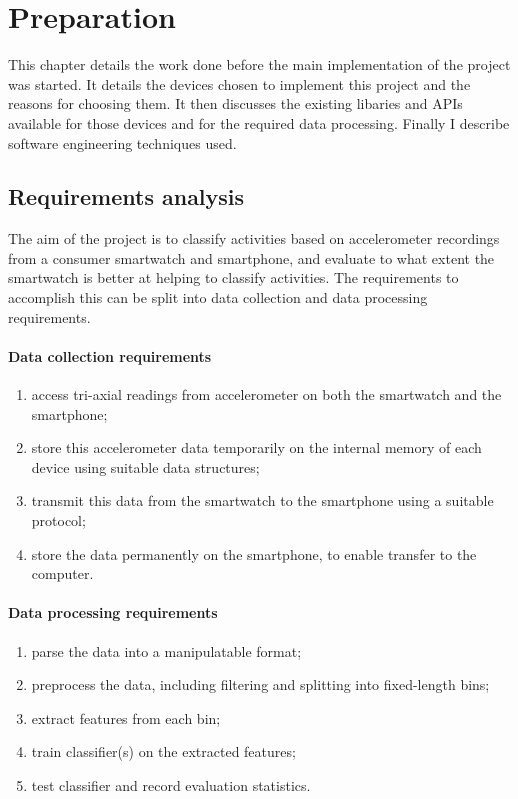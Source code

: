 \chapter{Preparation}
  This chapter details the work done before the main implementation of the project was started. It
  details the devices chosen to implement this project and the reasons for choosing them. It then
  discusses the existing libaries and APIs available for those devices and for the required data
  processing. Finally I describe software engineering techniques used.

  \section{Requirements analysis}
    The aim of the project is to classify activities based on accelerometer recordings from a consumer smartwatch and smartphone, and evaluate to what extent the smartwatch is better at helping to classify activities. The requirements to accomplish this can be split into data collection and data processing requirements.
    
    \subsubsection{Data collection requirements}
      \begin{enumerate}
        \item access tri-axial readings from accelerometer on both the smartwatch and the smartphone;
        \item store this accelerometer data temporarily on the internal memory of each device using suitable data structures;
        \item transmit this data from the smartwatch to the smartphone using a suitable protocol;
        \item store the data permanently on the smartphone, to enable transfer to the computer.
      \end{enumerate}
    
    \subsubsection{Data processing requirements}
      \begin{enumerate}
        \item parse the data into a manipulatable format;
        \item preprocess the data, including filtering and splitting into fixed-length bins;
        \item extract features from each bin;
        \item train classifier(s) on the extracted features;
        \item test classifier and record evaluation statistics.
      \end{enumerate}
    
